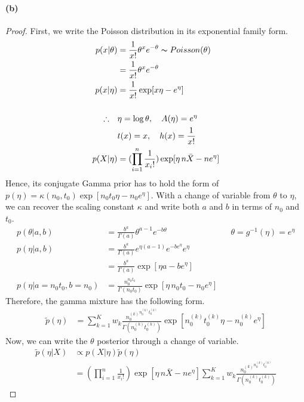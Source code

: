 \documentclass[11pt, letterpaper]{article}
\begin{document}
\paragraph{(b)}
\begin{proof}
First, we write the Poisson distribution in its exponential family form.
\begin{align*}
  p(x|\theta) &= \frac{1}{x!} \theta^x e^{-\theta} \thicksim Poisson(\theta) \\
    &= \frac{1}{x!} \theta^x e^{-\theta} \\
  p(x|\eta) &= \frac{1}{x!} \exp[x\eta - e^{\eta}] \\ \\
  \therefore \quad 
    & \eta = \log\theta, \quad A(\eta) = e^{\eta} \\
    & t(x) = x, \quad h(x) = \frac{1}{x!} \\
  p(X|\eta) &= (\prod_{i=1}^n \frac{1}{x_i !}) \exp[\eta \, n \bar{X} - n e^\eta]
\end{align*}
Hence, its conjugate Gamma prior has to hold the form of
$p(\eta) = \kappa(n_0, t_0)\exp[n_0 t_0 \eta - n_0 e^{\eta}]$.
With a change of variable from $\theta$ to $\eta$, we can recover the scaling constant $\kappa$ and write both $a$
and $b$ in terms of $n_0$ and $t_0$.
\begin{align*}
  p(\theta|a, b) &= \frac{b^a}{\Gamma(a)} \theta^{a-1} e^{-b\theta}
      && \theta = g^{-1}(\eta) = e^{\eta} \\
  p(\eta|a, b) &= \frac{b^a}{\Gamma(a)} e^{\eta(a-1)} e^{-b e^\eta} e^\eta \\
    &= \frac{b^a}{\Gamma(a)} \exp[\eta a - b e^\eta] \\
  p(\eta | a = n_0 t_0, b = n_0) &= \frac{n_0^{n_0 t_0}}{\Gamma(n_0 t_0)} \exp[\eta \, n_0 t_0 - n_0 e^\eta]
\end{align*}
Therefore, the gamma mixture has the following form.
\begin{align*}
  \tilde{p}(\eta) &= \sum_{k=1}^K w_k 
    \frac{{n_0^{(k)}}^{n_0^{(k)} t_0^{(k)}}}{\Gamma(n_0^{(k)} t_0^{(k)})}
    \exp[n_0^{(k)} t_0^{(k)} \eta - n_0^{(k)} e^{\eta}]
\end{align*}
Now, we can write the $\theta$ posterior through a change of variable.
\begin{align*}
  \tilde{p}(\eta|X) &\propto p(X|\eta)\tilde{p}(\eta) \\
    &= (\prod_{i=1}^n \frac{1}{x_i !}) \exp[\eta \, n \bar{X} - n e^\eta]
    \sum_{k=1}^K w_k
      \frac{{n_0^{(k)}}^{n_0^{(k)} t_0^{(k)}}}{\Gamma(n_0^{(k)} t_0^{(k)})}

\end{align*}
\end{proof}
\end{document}
